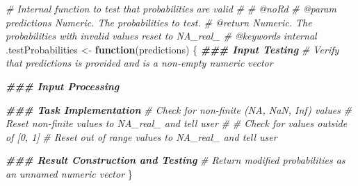 \documentclass[
]{book}
\newenvironment{Shaded}{\begin{snugshade}}{\end{snugshade}}
\newcommand{\CommentTok}[1]{\textcolor[rgb]{0.56,0.35,0.01}{\textit{#1}}}
\newcommand{\ControlFlowTok}[1]{\textcolor[rgb]{0.13,0.29,0.53}{\textbf{#1}}}
\newcommand{\DocumentationTok}[1]{\textcolor[rgb]{0.56,0.35,0.01}{\textbf{\textit{#1}}}}
\newcommand{\NormalTok}[1]{#1}
\newcommand{\OtherTok}[1]{\textcolor[rgb]{0.56,0.35,0.01}{#1}}
\begin{document}
\begin{Shaded}
\begin{Highlighting}[]
\CommentTok{\#\textquotesingle{} Internal function to test that probabilities are valid}
\CommentTok{\#\textquotesingle{} }
\CommentTok{\#\textquotesingle{} @noRd}
\CommentTok{\#\textquotesingle{} @param predictions Numeric. The probabilities to test.}
\CommentTok{\#\textquotesingle{} @return Numeric. The probabilities with invalid values reset to NA\_real\_}
\CommentTok{\#\textquotesingle{} @keywords internal}
\NormalTok{.testProbabilities }\OtherTok{\textless{}{-}} \ControlFlowTok{function}\NormalTok{(predictions) \{}
  \DocumentationTok{\#\#\# Input Testing}
  \CommentTok{\# Verify that \textasciigrave{}predictions\textasciigrave{} is provided and is a non{-}empty numeric vector}
  
  \DocumentationTok{\#\#\# Input Processing}
  
  \DocumentationTok{\#\#\# Task Implementation}
  \CommentTok{\# Check for non{-}finite (NA, NaN, Inf) values}
  \CommentTok{\# Reset non{-}finite values to NA\_real\_ and tell user}
  \CommentTok{\# }
  \CommentTok{\# Check for values outside of [0, 1]}
  \CommentTok{\# Reset out of range values to NA\_real\_ and tell user}
  
  \DocumentationTok{\#\#\# Result Construction and Testing}
  \CommentTok{\# Return modified probabilities as an unnamed numeric vector}
\NormalTok{\}}


\end{Highlighting}
\end{Shaded}
\end{document}
